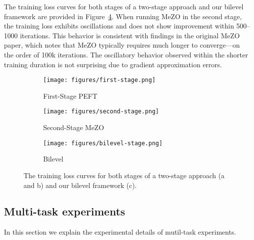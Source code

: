 The training loss curves for both stages of a two-stage approach and our bilevel framework are provided in Figure~\ref{fig:two-stage-loss-comparison}. When running MeZO in the second stage, the training loss exhibits oscillations and does not show improvement within 500–1000 iterations. This behavior is consistent with findings in the original MeZO~\cite{MalladiGNDL0A23Mezo} paper, which notes that MeZO typically requires much longer to converge—on the order of 100k iterations. The oscillatory behavior observed within the shorter training duration is not surprising due to gradient approximation errors.


\begin{figure}
    \centering
    \begin{subfigure}[b]{0.48\textwidth}
        \centering
        \texttt{[image: figures/first-stage.png]} 
        \caption{First-Stage PEFT}
        \label{fig:first-stage}
    \end{subfigure}
    \begin{subfigure}[b]{0.48\textwidth} 
        \centering
        \texttt{[image: figures/second-stage.png]}
        \caption{Second-Stage MeZO}
        \label{fig:second-stage}
    \end{subfigure}
        \begin{subfigure}[b]{0.5\textwidth} 
        \centering
        \texttt{[image: figures/bilevel-stage.png]}
        \caption{Bilevel}
        \label{fig:bilevel-stage}
    \end{subfigure}
    \caption{The training loss curves for both stages of a two-stage approach (a and b) and our bilevel framework (c).}
    \label{fig:two-stage-loss-comparison}
\end{figure}



\subsection{Multi-task experiments}\label{app:multi-task-exp}
In this section we explain the experimental details of mutil-task experiments.

